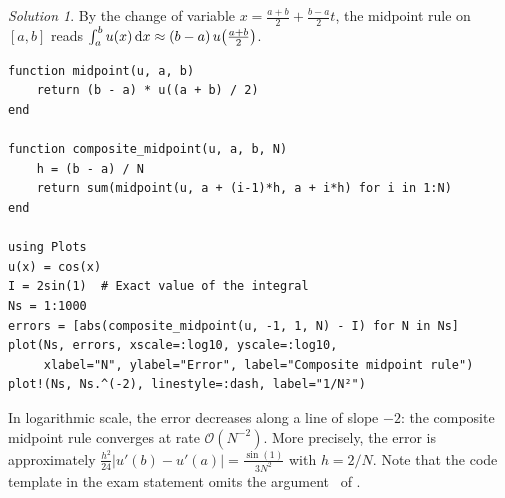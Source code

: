 \documentclass[10pt]{article}
\theoremstyle{definition}
\theoremstyle{remark}
\newtheorem*{protosolution}{Solution}
\newenvironment{solutionframe}
{%
    \begin{mdframed}[
        leftmargin=1cm,
        skipabove=.3cm,
        linecolor=blue,
        backgroundcolor=lightgreen,
        linewidth=0pt,
        innerleftmargin=.5em,
        innerrightmargin=.5em,
        innertopmargin=.3em,
        innerbottommargin=.6em,
    ]
}
{
    \end{mdframed}
}
\newenvironment{solution}
{\pushQED{\qed}\renewcommand{\qedsymbol}{$\triangle$}
\begin{solutionframe}\small \begin{protosolution}}
{\popQED\end{protosolution}\end{solutionframe}}
\begin{document}
\begin{solution}
    By the change of variable $x = \frac{a+b}{2} + \frac{b-a}{2} t$,
    the midpoint rule on $[a, b]$ reads $\int_a^b u(x) \, \mathrm d x \approx (b - a) \, u\bigl(\frac{a+b}{2}\bigr)$.
    \begin{verbatim}
function midpoint(u, a, b)
    return (b - a) * u((a + b) / 2)
end

function composite_midpoint(u, a, b, N)
    h = (b - a) / N
    return sum(midpoint(u, a + (i-1)*h, a + i*h) for i in 1:N)
end

using Plots
u(x) = cos(x)
I = 2sin(1)  # Exact value of the integral
Ns = 1:1000
errors = [abs(composite_midpoint(u, -1, 1, N) - I) for N in Ns]
plot(Ns, errors, xscale=:log10, yscale=:log10,
     xlabel="N", ylabel="Error", label="Composite midpoint rule")
plot!(Ns, Ns.^(-2), linestyle=:dash, label="1/N²")
    \end{verbatim}
    In logarithmic scale, the error decreases along a line of slope $-2$:
    the composite midpoint rule converges at rate $\mathcal O(N^{-2})$.
    More precisely, the error is approximately $\frac{h^2}{24} \bigl\lvert u'(b) - u'(a) \bigr\rvert = \frac{\sin(1)}{3N^2}$ with $h = 2/N$.
    Note that the code template in the exam statement omits the argument~ of .
\end{solution}
\end{document}
